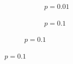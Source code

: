 \begin{figure}[h!]
\begin{subfigure}[b]{\textwidth}
\begin{subfigure}[b]{0.32\textwidth}
	         \caption{$p=0.01$}
	     \end{subfigure}
	     \hspace{0em}
	     \begin{subfigure}[b]{0.32\textwidth}
	         \caption{$p=0.1$}


\end{subfigure}
\end{subfigure}
\end{figure}
